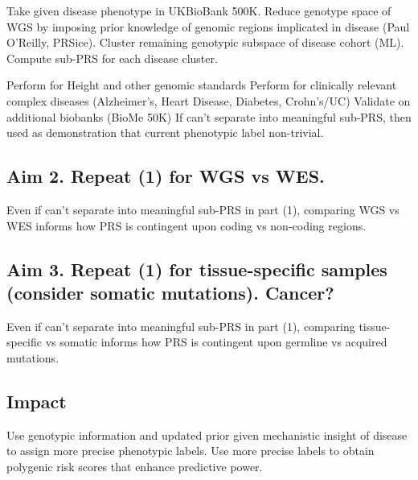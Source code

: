 \documentclass[11pt]{article}  %
\begin{document}
Take given disease phenotype in UKBioBank 500K. Reduce genotype space of WGS by imposing prior knowledge of genomic regions implicated in disease (Paul O’Reilly, PRSice). Cluster remaining genotypic subspace of disease cohort (ML). Compute sub-PRS for each disease cluster.

Perform for Height and other genomic standards
Perform for clinically relevant complex diseases (Alzheimer’s, Heart Disease, Diabetes, Crohn’s/UC)
Validate on additional biobanks (BioMe 50K)
If can’t separate into meaningful sub-PRS, then used as demonstration that current phenotypic label non-trivial.


\subsection*{Aim 2. Repeat (1) for WGS vs WES.}
Even if can’t separate into meaningful sub-PRS in part (1), comparing WGS vs WES informs how PRS is contingent upon coding vs non-coding regions.

\subsection*{Aim 3. Repeat (1) for tissue-specific samples (consider somatic mutations). Cancer?}
Even if can’t separate into meaningful sub-PRS in part (1), comparing tissue-specific vs somatic informs how PRS is contingent upon germline vs acquired mutations.

\subsection*{Impact}
Use genotypic information and updated prior given mechanistic insight of disease to assign more precise phenotypic labels. Use more precise labels to obtain polygenic risk scores that enhance predictive power.












\newpage

\end{document}
